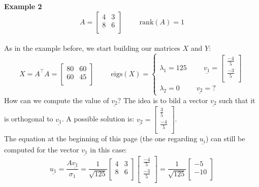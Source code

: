 \textbf{Example 2}
\[
A = \begin{bmatrix}
    4 & 3\\
    8 & 6\\
\end{bmatrix}
\hspace{1cm}
\text{rank}(A) = 1    
\]\\
As in the example before, we start building our matrices $X$ and $Y$:
\[
X = A^\intercal A = \begin{bmatrix}
    80 & 60\\
    60 & 45\\
\end{bmatrix}
\hspace{1cm}
\text{eigs}(X) =
\begin{cases}
    \lambda_1 = 125 \hspace{1cm} \underline{v_1} = \begin{bmatrix}
        \frac{-4}{5}\\
        \frac{-3}{5}\\
    \end{bmatrix}\\
    \lambda_2 = 0 \hspace{1cm} \underline{v_2} = ?
\end{cases}
\]
How can we compute the value of $\underline{v_2}$? The idea is to bild a vector $\underline{v_2}$ such that it is orthogonal to $\underline{v_1}$. 
A possible solution is: $\underline{v_2} = \begin{bmatrix}
    \frac{3}{5}\\
    \frac{-4}{5}\\
\end{bmatrix}$.\\
The equation at the beginning of this page (the one regarding $\underline{u_i}$) can still be computed for the vector $\underline{v_1}$ in this case:
\[
\underline{u_1} = \dfrac{A\underline{v_1}}{\sigma_1} = \dfrac{1}{\sqrt{125}}\begin{bmatrix}
    4 & 3\\
    8 & 6\\
\end{bmatrix}
\begin{bmatrix}
    \frac{-4}{5}\\
    \frac{-3}{5}\\
\end{bmatrix} = \dfrac{1}{\sqrt{125}}\begin{bmatrix}
-5\\
-10\\    
\end{bmatrix}
\]
